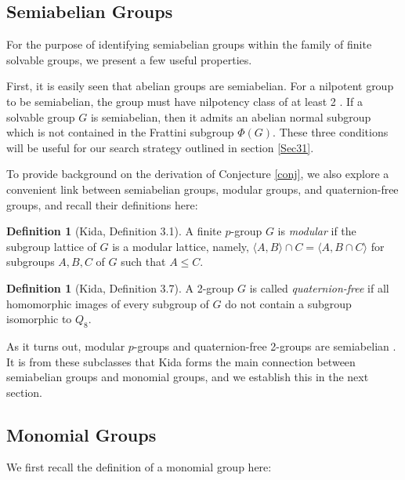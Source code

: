 \documentclass[11pt]{article}
\theoremstyle{definition}
\newtheorem{defn}[thm]{Definition}
\numberwithin{equation}{section}
\begin{document}
\begin{humanblock}
\subsection{Semiabelian Groups}
For the purpose of identifying semiabelian groups within the family of finite solvable groups, we present a few useful properties.   


First, it is easily seen that abelian groups are semiabelian. For a nilpotent group to be semiabelian, the group must have nilpotency class of at least 2 \cite{Thompson84}. If a solvable group $G$ is semiabelian, then it admits an abelian normal subgroup which is not contained in the Frattini subgroup $\Phi(G)$. These three conditions will be useful for our search strategy outlined in section \ref{Sec31}. 


To provide background on the derivation of Conjecture \ref{conj}, we also explore a convenient link between semiabelian groups, modular groups, and quaternion-free groups, and recall their definitions here:


\begin{defn}[Kida, Definition 3.1]
    A finite $p$-group $G$ is \textit{modular} if the subgroup lattice of $G$ is a modular lattice, namely, $\langle A, B \rangle \cap C = \langle A, B \cap C \rangle$ for subgroups $A, B, C$ of $G$
such that $A \leq C$.
\end{defn}

\begin{defn}[Kida, Definition 3.7]
A 2-group $G$ is called \textit{quaternion-free} if all homomorphic images of every subgroup of $G$ do not contain a subgroup isomorphic to $Q_8$. 
\end{defn}

As it turns out, modular $p$-groups and quaternion-free 2-groups are semiabelian \cite{Kida25}. It is from these subclasses that Kida forms the main connection between semiabelian groups and monomial groups, and we establish this in the next section.  



\subsection{Monomial Groups}
We first recall the definition of a monomial group here: 


\end{humanblock}
\end{document}
